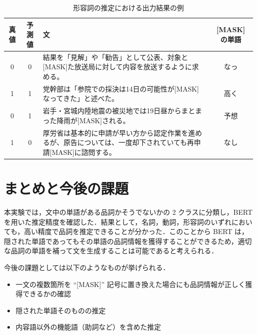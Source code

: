 \documentclass[twocolumn]{jarticle}
\begin{document}
\begin{table}[t]
 \caption{形容詞の推定における出力結果の例}
    \begin{center}
 \begin{tabular}{|c|c|p{30em}|c|} \hline
  真値 & 予測値 & 文 & [MASK] の単語 \\ \hline \hline
  0 & 0 & 結果を「見解」や「勧告」として公表、対象と[MASK]た放送局に対して内容を放送するように求める。 & なっ \\ \hline
  1 & 1 & 党幹部は「参院での採決は14日の可能性が[MASK]なってきた」と述べた。 & 高く  \\ \hline
  0 & 1 & 岩手・宮城内陸地震の被災地では19日昼からまとまった降雨が[MASK]される。 & 予想 \\ \hline
  1 & 0 &	厚労省は基本的に申請が早い方から認定作業を進めるが、原告については、一度却下されていても再申請[MASK]に諮問する。 & なし  \\ \hline
\end{tabular}
    \end{center}
 \label{tb:5}
\end{table}



\section{まとめと今後の課題}
本実験では，文中の単語がある品詞かそうでないかの 2 クラスに分類し，BERT を用いた推定精度を確認した．結果として，名詞，動詞，形容詞のいずれにおいても，高い精度で品詞を推定できることが分かった．このことから BERT は，隠された単語であってもその単語の品詞情報を獲得することができるため，適切な品詞の単語を補って文を生成することは可能であると考えられる．\par
今後の課題としては以下のようなものが挙げられる．
\begin{itemize}
  \item 一文の複数箇所を “[MASK]” 記号に置き換えた場合にも品詞情報が正しく獲得できるかの確認
  \item 隠された単語そのものの推定
  \item 内容語以外の機能語（助詞など）を含めた推定
\end{itemize}







\end{document}
